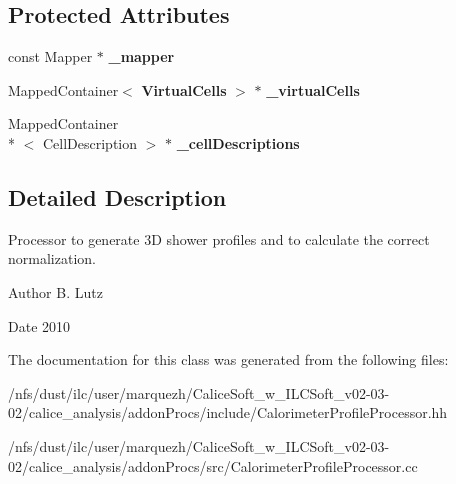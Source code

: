 \subsection*{Protected Attributes}
\begin{DoxyCompactItemize}
\item 
const Mapper $\ast$ {\bfseries \-\_\-mapper}\label{classCALICE_1_1CalorimeterProfileProcessor_a180872f0576cba660651644d8afd3c70}

\item 
Mapped\-Container$<$ {\bf Virtual\-Cells} $>$ $\ast$ {\bfseries \-\_\-virtual\-Cells}\label{classCALICE_1_1CalorimeterProfileProcessor_ae4628e74d54c7e3a4c9f0f8153641893}

\item 
Mapped\-Container\\*
$<$ Cell\-Description $>$ $\ast$ {\bfseries \-\_\-cell\-Descriptions}\label{classCALICE_1_1CalorimeterProfileProcessor_adac04f1d0b6c152dd47b33850c7e2897}

\end{DoxyCompactItemize}


\subsection{Detailed Description}
Processor to generate 3\-D shower profiles and to calculate the correct normalization.

\begin{DoxyAuthor}{Author}
B. Lutz 
\end{DoxyAuthor}
\begin{DoxyDate}{Date}
2010 
\end{DoxyDate}


The documentation for this class was generated from the following files\-:\begin{DoxyCompactItemize}
\item 
/nfs/dust/ilc/user/marquezh/\-Calice\-Soft\-\_\-w\-\_\-\-I\-L\-C\-Soft\-\_\-v02-\/03-\/02/calice\-\_\-analysis/addon\-Procs/include/Calorimeter\-Profile\-Processor.\-hh\item 
/nfs/dust/ilc/user/marquezh/\-Calice\-Soft\-\_\-w\-\_\-\-I\-L\-C\-Soft\-\_\-v02-\/03-\/02/calice\-\_\-analysis/addon\-Procs/src/Calorimeter\-Profile\-Processor.\-cc\end{DoxyCompactItemize}
